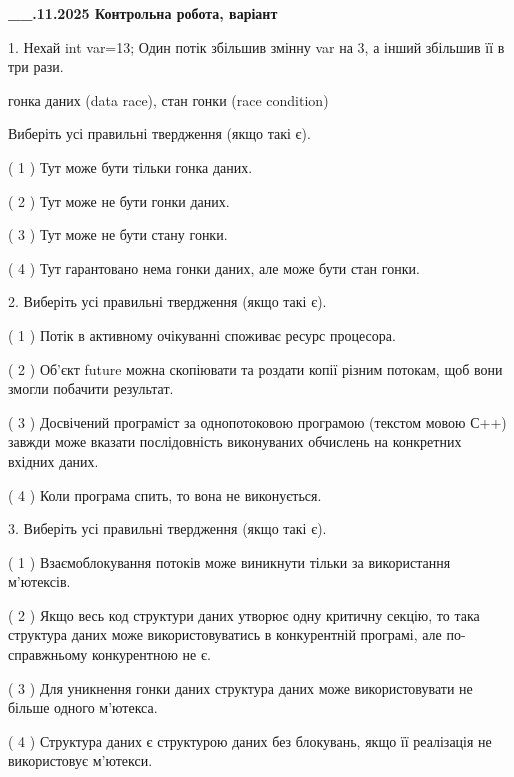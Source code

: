 \documentclass[12pt, ukrainian]{article}
\begin{document}
\newpage
\begin {large}

\textbf{\_\_.11.2025 Контрольна робота, варіант  }\par


{
1. Нехай int var=13; Один потік збільшив змінну var на 3, а інший збільшив її в три рази.

гонка даних (data race), стан гонки (race condition)

Виберіть усі правильні твердження (якщо такі є).\par
\vspace{2mm}
( 1 ) Тут може бути тільки гонка даних.%

( 2 ) Тут може не бути гонки даних.%

( 3 ) Тут може не бути стану гонки.%

( 4 ) Тут гарантовано нема гонки даних, але може бути стан гонки.%


2. Виберіть усі правильні твердження (якщо такі є).\par
\vspace{2mm}

( 1 ) Потік в активному очікуванні споживає ресурс процесора.%

( 2 ) Об’єкт future можна скопіювати та роздати копії різним потокам, щоб вони змогли побачити результат.%

( 3 ) Досвічений програміст за однопотоковою програмою (текстом мовою С++) завжди може вказати послідовність виконуваних обчислень на конкретних вхідних даних.%

( 4 ) Коли програма спить, то вона не виконується.%


3. Виберіть усі правильні твердження (якщо такі є).\par
\vspace{2mm}

( 1 ) Взаємоблокування потоків може виникнути тільки за використання м’ютексів.%

( 2 ) Якщо весь код структури даних утворює одну критичну секцію, то така структура даних може використовуватись в конкурентній програмі, але по-справжньо\-му конкурентною не є.%

( 3 ) Для уникнення гонки даних структура даних може використовувати не більше одного м’ютекса.%

( 4 ) Структура даних є структурою даних без блокувань, якщо її реалізація не використовує м’ютекси.%


}
\end{large}
\end{document}
